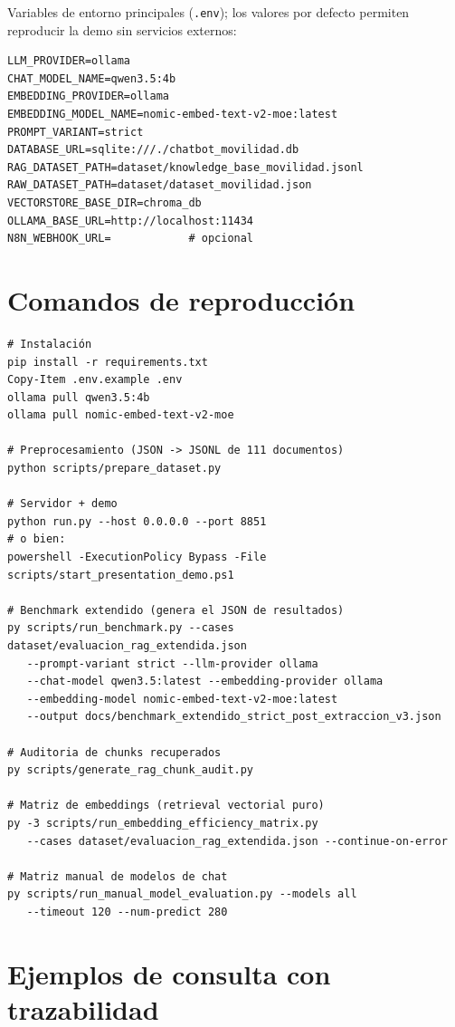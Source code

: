\documentclass[11pt,a4paper]{article}
\newcommand{\code}[1]{\texttt{#1}}
\begin{document}
Variables de entorno principales (\code{.env}); los valores por defecto
permiten reproducir la demo sin servicios externos:

\begin{verbatim}
LLM_PROVIDER=ollama
CHAT_MODEL_NAME=qwen3.5:4b
EMBEDDING_PROVIDER=ollama
EMBEDDING_MODEL_NAME=nomic-embed-text-v2-moe:latest
PROMPT_VARIANT=strict
DATABASE_URL=sqlite:///./chatbot_movilidad.db
RAG_DATASET_PATH=dataset/knowledge_base_movilidad.jsonl
RAW_DATASET_PATH=dataset/dataset_movilidad.json
VECTORSTORE_BASE_DIR=chroma_db
OLLAMA_BASE_URL=http://localhost:11434
N8N_WEBHOOK_URL=            # opcional
\end{verbatim}

\section{Comandos de reproducción}\label{anexo:comandos}

\begin{verbatim}
# Instalación
pip install -r requirements.txt
Copy-Item .env.example .env
ollama pull qwen3.5:4b
ollama pull nomic-embed-text-v2-moe

# Preprocesamiento (JSON -> JSONL de 111 documentos)
python scripts/prepare_dataset.py

# Servidor + demo
python run.py --host 0.0.0.0 --port 8851
# o bien:
powershell -ExecutionPolicy Bypass -File scripts/start_presentation_demo.ps1

# Benchmark extendido (genera el JSON de resultados)
py scripts/run_benchmark.py --cases dataset/evaluacion_rag_extendida.json
   --prompt-variant strict --llm-provider ollama
   --chat-model qwen3.5:latest --embedding-provider ollama
   --embedding-model nomic-embed-text-v2-moe:latest
   --output docs/benchmark_extendido_strict_post_extraccion_v3.json

# Auditoria de chunks recuperados
py scripts/generate_rag_chunk_audit.py

# Matriz de embeddings (retrieval vectorial puro)
py -3 scripts/run_embedding_efficiency_matrix.py
   --cases dataset/evaluacion_rag_extendida.json --continue-on-error

# Matriz manual de modelos de chat
py scripts/run_manual_model_evaluation.py --models all
   --timeout 120 --num-predict 280
\end{verbatim}

\section{Ejemplos de consulta con trazabilidad}\label{anexo:ejemplos}
\end{document}
